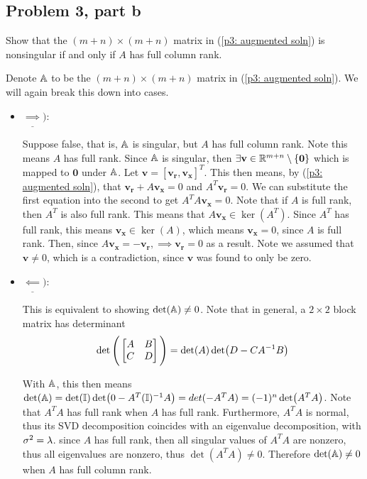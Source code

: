 \subsection{Problem 3, part b}
Show that the $(m + n) \times (m + n)$ matrix in (\ref{p3: augmented soln}) is nonsingular if and only if $A$ has full column rank.
\partbreak
\begin{solution}

    Denote $\mathbb{A}$ to be the $(m + n) \times (m + n)$ matrix in (\ref{p3: augmented soln}). We will again break this down into cases. 

    \begin{itemize}
        \item $\underline{\implies}):$ 

        Suppose false, that is, $\mathbb{A}$ is singular, but $A$ has full column rank. Note this means $A$ has full rank. Since $\mathbb{A}$ is singular, then $\exists \textbf{v} \in \mathbb{R}^{m + n} \setminus \{\textbf{0}\}$ which is mapped to $\textbf{0}$ under $\mathbb{A}$. Let $\textbf{v} = [\textbf{v}_\textbf{r}, \textbf{v}_\textbf{x}]^T$. This then means, by (\ref{p3: augmented soln}), that  $\textbf{v}_\textbf{r} + A\textbf{v}_\textbf{x} = 0$ and $A^T\textbf{v}_\textbf{r} = 0$. We can substitute the first equation into the second to get $A^TA\textbf{v}_\textbf{x} = 0$. Note that if $A$ is full rank, then $A^T$ is also full rank. This means that $A\textbf{v}_\textbf{x} \in \ker(A^T)$. Since $A^T$ has full rank, this means $\textbf{v}_\textbf{x} \in \ker(A)$, which means $\textbf{v}_\textbf{x} =0 $, since $A$ is full rank. Then, since $A\textbf{v}_\textbf{x} = -\textbf{v}_\textbf{r}, \implies \textbf{v}_\textbf{r} = 0$ as a result. Note we assumed that $\textbf{v} \neq 0$, which is a contradiction, since $\textbf{v}$ was found to only be zero. 

        \item $\underline{\impliedby}):$

        This is equivalent to showing $\det (\mathbb{A}) \neq 0$. Note that in general, a $2\times 2$ block matrix has determinant
        \[
        \det \Bigg( \begin{bmatrix}A &B\\C &D\end{bmatrix}\Bigg) = \det(A)\det(D - CA^{-1} B)
        \]

        With $\mathbb{A}$, this then means $\det(\mathbb{A}) = \det(\mathbb{I})\det(0 - A^T(\mathbb{I})^{-1} A) = det(-A^TA) = (-1)^n\det(A^TA)$. Note that $A^TA$ has full rank when $A$ has full rank. Furthermore, $A^TA$ is normal, thus its SVD decomposition coincides with an eigenvalue decomposition, with $\sigma^2 = \lambda$. since $A$ has full rank, then all singular values of $A^TA$ are nonzero, thus all eigenvalues are nonzero, thus $\det(A^TA) \neq 0$. Therefore $\det(\mathbb{A}) \neq 0$ when $A$ has full column rank. 
    \end{itemize}
\end{solution}

